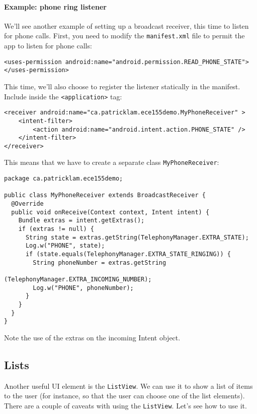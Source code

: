 \paragraph{Example: phone ring listener}
We'll see another example of setting up a broadcast receiver, this time to listen
for phone calls. First, you need to modify the {\tt manifest.xml} file to permit
the app to listen for phone calls:

\begin{verbatim}
<uses-permission android:name="android.permission.READ_PHONE_STATE">
</uses-permission>
\end{verbatim}

This time, we'll also choose to register the listener statically in
the manifest. Include inside the \verb+<application>+ tag:

\begin{verbatim}
<receiver android:name="ca.patricklam.ece155demo.MyPhoneReceiver" >
    <intent-filter>
        <action android:name="android.intent.action.PHONE_STATE" />
    </intent-filter>
</receiver>
\end{verbatim}
This means that we have to create a separate class {\tt MyPhoneReceiver}:
{\small \begin{verbatim}
package ca.patricklam.ece155demo;

public class MyPhoneReceiver extends BroadcastReceiver {
  @Override
  public void onReceive(Context context, Intent intent) {
    Bundle extras = intent.getExtras();
    if (extras != null) {
      String state = extras.getString(TelephonyManager.EXTRA_STATE);
      Log.w("PHONE", state);
      if (state.equals(TelephonyManager.EXTRA_STATE_RINGING)) {
        String phoneNumber = extras.getString
                               (TelephonyManager.EXTRA_INCOMING_NUMBER);
        Log.w("PHONE", phoneNumber);
      }
    }
  }
}
\end{verbatim}}
Note the use of the extras on the incoming Intent object.


\subsection*{Lists}
Another useful UI element is the {\tt ListView}. We can use it to show 
a list of items to the user (for instance, so that the user can choose
one of the list elements). There are a couple of caveats with using the
{\tt ListView}. Let's see how to use it.

